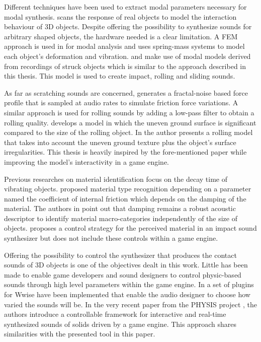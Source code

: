 Different techniques have been used to extract modal parameters necessary for modal synthesis. \cite{pai2001scanning} scans the response of real objects to model the interaction behaviour of 3D objects. Despite offering the possibility to synthesize sounds for arbitrary shaped objects, the hardware needed is a clear limitation. A \gls{FEM} approach is used in \cite{o2002synthesizing} for modal analysis and \cite{raghuvanshi2006interactive} uses spring-mass systems to model each object's deformation and vibration.\cite{van2001foleyautomatic} and \cite{lloyd2011sound} make use of modal models derived from recordings of struck objects which is similar to the approach described in this thesis. This model is used to create impact, rolling and sliding sounds.

As far as scratching sounds are concerned, \cite{van2001foleyautomatic} generates a fractal-noise based force profile that is sampled at audio rates to simulate friction force variations. A similar approach is used for rolling sounds by adding a low-pass filter to obtain a rolling quality. \cite{rath2003expressive} develops a model in which the uneven ground surface is significant compared to the size of the rolling object. In \cite{farnell2010designing} the author presents a rolling model that takes into account the uneven ground texture plus the object's surface irregularities. This thesis is heavily inspired by the fore-mentioned paper while improving the model's interactivity in a game engine.

Previous researches on material identification focus on the decay time of vibrating objects. \cite{wildes1988recovering} proposed material type recognition depending on a parameter named the coefficient of internal friction which depends on the damping of the material. The authors in \cite{giordano2006material} point out that damping remains a robust acoustic descriptor to identify material macro-categories independently of the size of objects. \cite{aramaki2011controlling} proposes a control strategy for the perceived material in an impact sound synthesizer but does not include these controls within a game engine.

Offering the possibility to control the synthesizer that produces the contact sounds of 3D objects is one of the objectives dealt in this work. Little has been made to enable game developers and sound designers to control physic-based sounds through high level parameters within the game engine. In \cite{lloyd2011sound} a set of plugins for Wwise \cite{bib:wwise} have been implemented that enable the audio designer to choose how varied the sounds will be. In the very recent paper \cite{pruvost2015perception} from the PHYSIS project \cite{bib:physis}, the authors introduce a  controllable framework for interactive and real-time synthesized sounds of solids driven by a game engine. This approach shares similarities with the presented tool in this paper.

